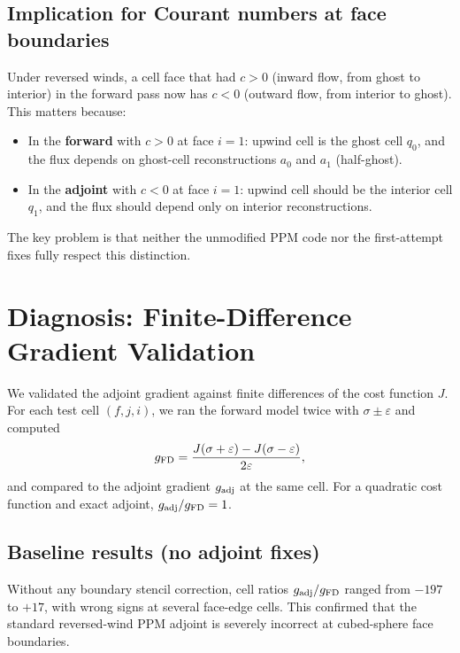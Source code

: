 \documentclass[11pt]{article}
\begin{document}
\subsection{Implication for Courant numbers at face boundaries}

Under reversed winds, a cell face that had $c > 0$ (inward flow, from ghost
to interior) in the forward pass now has $c < 0$ (outward flow, from
interior to ghost). This matters because:
\begin{itemize}
  \item In the \textbf{forward} with $c > 0$ at face $i=1$: upwind cell is
    the ghost cell $q_0$, and the flux depends on ghost-cell
    reconstructions $a_0$ and $a_1$ (half-ghost).
  \item In the \textbf{adjoint} with $c < 0$ at face $i=1$: upwind cell
    should be the interior cell $q_1$, and the flux should depend only on
    interior reconstructions.
\end{itemize}
The key problem is that neither the unmodified PPM code nor the first-attempt
fixes fully respect this distinction.

\section{Diagnosis: Finite-Difference Gradient Validation}

We validated the adjoint gradient against finite differences of the cost
function $J$. For each test cell $(f, j, i)$, we ran the forward model
twice with $\sigma \pm \varepsilon$ and computed
\begin{equation}
  g_{\rm FD} = \frac{J(\sigma+\varepsilon) - J(\sigma-\varepsilon)}{2\varepsilon},
  \label{eq:fd}
\end{equation}
and compared to the adjoint gradient $g_{\rm adj}$ at the same cell. For
a quadratic cost function and exact adjoint, $g_{\rm adj}/g_{\rm FD} = 1$.

\subsection{Baseline results (no adjoint fixes)}

Without any boundary stencil correction, cell ratios $g_{\rm adj}/g_{\rm FD}$
ranged from $-197$ to $+17$, with wrong signs at several face-edge cells.
This confirmed that the standard reversed-wind PPM adjoint is severely
incorrect at cubed-sphere face boundaries.
\end{document}
